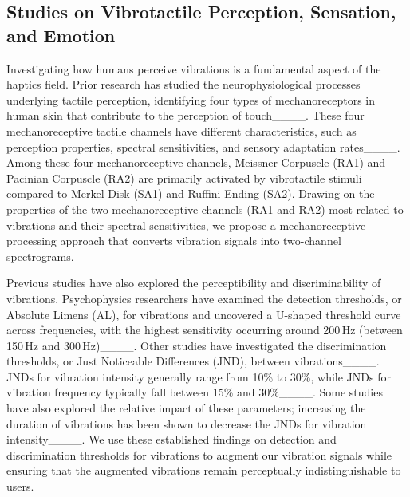 \subsection{Studies on Vibrotactile Perception, Sensation, and Emotion}

Investigating how humans perceive vibrations is a fundamental aspect of the haptics field.
Prior research has studied the neurophysiological processes underlying tactile perception, identifying four types of mechanoreceptors in human skin that contribute to the perception of touch____.
These four mechanoreceptive tactile channels have different characteristics, such as perception properties, spectral sensitivities, and sensory adaptation rates____.
Among these four mechanoreceptive channels, Meissner Corpuscle (RA1) and Pacinian Corpuscle (RA2) are primarily activated by vibrotactile stimuli compared to Merkel Disk (SA1) and Ruffini Ending (SA2).
Drawing on the properties of the two mechanoreceptive channels (RA1 and RA2) most related to vibrations and their spectral sensitivities, we propose a mechanoreceptive processing approach that converts vibration signals into two-channel spectrograms.


Previous studies have also explored the perceptibility and discriminability of vibrations.
Psychophysics researchers have examined the detection thresholds, or Absolute Limens (AL), for vibrations and uncovered a U-shaped threshold curve across frequencies, with the highest sensitivity occurring around 200\,Hz (between 150\,Hz and 300\,Hz)____.
Other studies have investigated the discrimination thresholds, or Just Noticeable Differences (JND), between vibrations____.
JNDs for vibration intensity generally range from 10\% to 30\%, while JNDs for vibration frequency typically fall between 15\% and 30\%____.
Some studies have also explored the relative impact of these parameters; increasing the duration of vibrations has been shown to decrease the JNDs for vibration intensity____.
We use these established findings on detection and discrimination thresholds for vibrations to augment our vibration signals while ensuring that the augmented vibrations remain perceptually indistinguishable to users.


